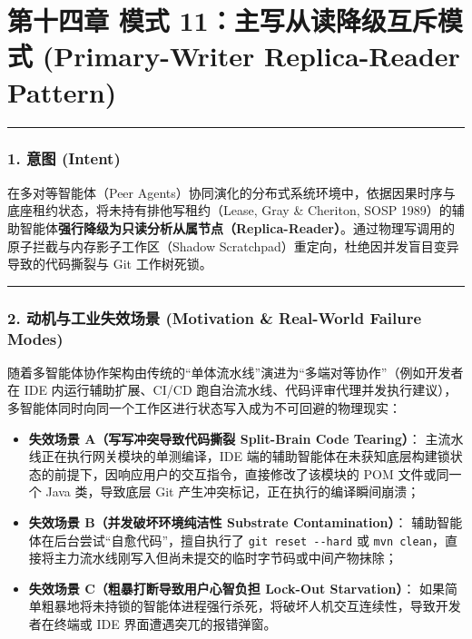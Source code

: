 \documentclass[
]{ctexart}
\providecommand{\tightlist}{%
  \setlength{\itemsep}{0pt}\setlength{\parskip}{0pt}}
\renewcommand{\_}{\discretionary{}{}{\textunderscore}}
\let\oldsection\section
\renewcommand{\section}{\clearpage\oldsection}
\begin{document}
\section{第十四章 模式 11：主写从读降级互斥模式 (Primary-Writer Replica-Reader
Pattern)}\label{ux6a21ux5f0f-11ux4e3bux5199ux4eceux8bfbux964dux7ea7ux4e92ux65a5ux6a21ux5f0f-primary-writer-replica-reader-pattern}

\begin{center}\rule{0.5\linewidth}{0.5pt}\end{center}

\subsubsection{1. 意图 (Intent)}\label{ux610fux56fe-intent-10}

在多对等智能体（Peer
Agents）协同演化的分布式系统环境中，依据因果时序与底座租约状态，将未持有排他写租约（Lease,
Gray \& Cheriton, SOSP
1989）的辅助智能体\textbf{强行降级为只读分析从属节点（Replica-Reader）}。通过物理写调用的原子拦截与内存影子工作区（Shadow
Scratchpad）重定向，杜绝因并发盲目变异导致的代码撕裂与 Git 工作树死锁。

\begin{center}\rule{0.5\linewidth}{0.5pt}\end{center}

\subsubsection{2. 动机与工业失效场景 (Motivation \& Real-World Failure
Modes)}\label{ux52a8ux673aux4e0eux5de5ux4e1aux5931ux6548ux573aux666f-motivation-real-world-failure-modes-10}

随着多智能体协作架构由传统的``单体流水线''演进为``多端对等协作''（例如开发者在
IDE 内运行辅助扩展、CI/CD
跑自治流水线、代码评审代理并发执行建议），多智能体同时向同一个工作区进行状态写入成为不可回避的物理现实：

\begin{itemize}
\tightlist
\item
  \textbf{失效场景 A（写写冲突导致代码撕裂 Split-Brain Code Tearing）}：
  主流水线正在执行网关模块的单测编译，IDE
  端的辅助智能体在未获知底层构建锁状态的前提下，因响应用户的交互指令，直接修改了该模块的
  POM 文件或同一个 Java 类，导致底层 Git
  产生冲突标记，正在执行的编译瞬间崩溃；
\item
  \textbf{失效场景 B（并发破坏环境纯洁性 Substrate Contamination）}：
  辅助智能体在后台尝试``自愈代码''，擅自执行了
  \texttt{git\ reset\ -\/-hard} 或
  \texttt{mvn\ clean}，直接将主力流水线刚写入但尚未提交的临时字节码或中间产物抹除；
\item
  \textbf{失效场景 C（粗暴打断导致用户心智负担 Lock-Out Starvation）}：
  如果简单粗暴地将未持锁的智能体进程强行杀死，将破坏人机交互连续性，导致开发者在终端或
  IDE 界面遭遇突兀的报错弹窗。
\end{itemize}
\end{document}
